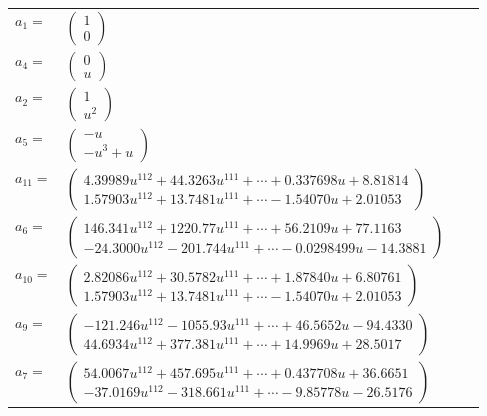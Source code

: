 \documentclass[1p]{elsarticle_modified}
\theoremstyle{definition}
\begin{document}
\begin{tabular}{m{7pt} m{180pt} m{7pt} m{180pt} }
\flushright $a_{1}=$&$\begin{pmatrix}1\\0\end{pmatrix}$ \\
\flushright $a_{4}=$&$\begin{pmatrix}0\\u\end{pmatrix}$ \\
\flushright $a_{2}=$&$\begin{pmatrix}1\\u^2\end{pmatrix}$ \\
\flushright $a_{5}=$&$\begin{pmatrix}- u\\- u^3+u\end{pmatrix}$ \\
\flushright $a_{11}=$&$\begin{pmatrix}4.39989 u^{112}+44.3263 u^{111}+\cdots+0.337698 u+8.81814\\1.57903 u^{112}+13.7481 u^{111}+\cdots-1.54070 u+2.01053\end{pmatrix}$ \\
\flushright $a_{6}=$&$\begin{pmatrix}146.341 u^{112}+1220.77 u^{111}+\cdots+56.2109 u+77.1163\\-24.3000 u^{112}-201.744 u^{111}+\cdots-0.0298499 u-14.3881\end{pmatrix}$ \\
\flushright $a_{10}=$&$\begin{pmatrix}2.82086 u^{112}+30.5782 u^{111}+\cdots+1.87840 u+6.80761\\1.57903 u^{112}+13.7481 u^{111}+\cdots-1.54070 u+2.01053\end{pmatrix}$ \\
\flushright $a_{9}=$&$\begin{pmatrix}-121.246 u^{112}-1055.93 u^{111}+\cdots+46.5652 u-94.4330\\44.6934 u^{112}+377.381 u^{111}+\cdots+14.9969 u+28.5017\end{pmatrix}$ \\
\flushright $a_{7}=$&$\begin{pmatrix}54.0067 u^{112}+457.695 u^{111}+\cdots+0.437708 u+36.6651\\-37.0169 u^{112}-318.661 u^{111}+\cdots-9.85778 u-26.5176\end{pmatrix}$ \\

\end{tabular}
\end{document}
